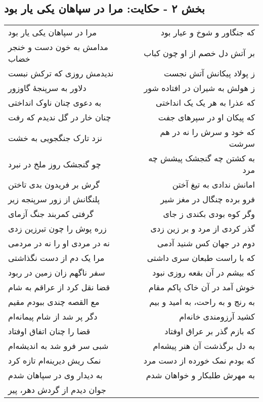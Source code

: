 \begin{center}
\section*{بخش ۲ - حکایت: مرا در سپاهان یکی یار بود}
\label{sec:002}
\begin{longtable}{l p{0.5cm} r}
مرا در سپاهان یکی یار بود
&&
که جنگاور و شوخ و عیار بود
\\
مدامش به خون دست و خنجر خضاب
&&
بر آتش دل خصم از او چون کباب
\\
ندیدمش روزی که ترکش نبست
&&
ز پولاد پیکانش آتش نجست
\\
دلاور به سرپنجهٔ گاوزور
&&
ز هولش به شیران در افتاده شور
\\
به دعوی چنان ناوک انداختی
&&
که عذرا به هر یک یک انداختی
\\
چنان خار در گل ندیدم که رفت
&&
که پیکان او در سپرهای جفت
\\
نزد تارک جنگجویی به خشت
&&
که خود و سرش را نه در هم سرشت
\\
چو گنجشک روز ملخ در نبرد
&&
به کشتن چه گنجشک پیشش چه مرد
\\
گرش بر فریدون بدی تاختن
&&
امانش ندادی به تیغ آختن
\\
پلنگانش از زور سرپنجه زیر
&&
فرو برده چنگال در مغز شیر
\\
گرفتی کمربند جنگ آزمای
&&
وگر کوه بودی بکندی ز جای
\\
زره پوش را چون تبرزین زدی
&&
گذر کردی از مرد و بر زین زدی
\\
نه در مردی او را نه در مردمی
&&
دوم در جهان کس شنید آدمی
\\
مرا یک دم از دست نگذاشتی
&&
که با راست طبعان سری داشتی
\\
سفر ناگهم زان زمین در ربود
&&
که بیشم در آن بقعه روزی نبود
\\
قضا نقل کرد از عراقم به شام
&&
خوش آمد در آن خاک پاکم مقام
\\
مع القصه چندی ببودم مقیم
&&
به رنج و به راحت، به امید و بیم
\\
دگر پر شد از شام پیمانه‌ام
&&
کشید آرزومندی خانه‌ام
\\
قضا را چنان اتفاق اوفتاد
&&
که بازم گذر بر عراق اوفتاد
\\
شبی سر فرو شد به اندیشه‌ام
&&
به دل برگذشت آن هنر پیشه‌ام
\\
نمک ریش دیرینه‌ام تازه کرد
&&
که بودم نمک خورده از دست مرد
\\
به دیدار وی در سپاهان شدم
&&
به مهرش طلبکار و خواهان شدم
\\
جوان دیدم از گردش دهر، پیر

\end{longtable}
\end{center}
